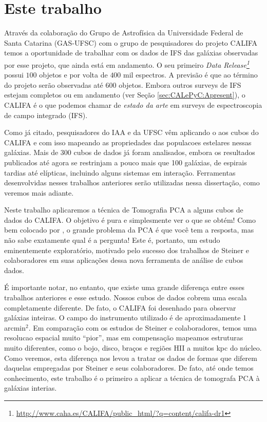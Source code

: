 \section{Este trabalho}
\label{sec:Intro:ThisWork}

Através da colaboração do Grupo de Astrofísica da Universidade Federal de Santa Catarina (GAS-UFSC) com o grupo de
pesquisadores do projeto CALIFA temos a oportunidade de trabalhar com os dados de IFS das galáxias observadas por esse
projeto, que ainda está em andamento. O seu primeiro {\em Data
Release\footnote{\url{http://www.caha.es/CALIFA/public_html/?q=content/califa-dr1}}} \citep[][DR1]{Husemann2013} possui
$100$ objetos e por volta de $400$ mil espectros. A previsão é que ao término do projeto serão observadas até $600$
objetos. Embora outros surveys de IFS estejam completos ou em andamento (ver Seção \ref{sec:CALePyC:Apresent}), o CALIFA
é o que podemos chamar de {\em estado da arte} em surveys de espectroscopia de campo integrado (IFS).

Como já citado, pesquisadores do IAA e da UFSC vêm aplicando o \starlight aos cubos do CALIFA e com isso mapeando as
propriedades das populacoes estelares nessas galáxias. Mais de 300 cubos de dados já foram analisados, embora os
resultados publicados até agora se restrinjam a pouco mais que 100 galáxias, de espirais tardias até elípticas,
incluindo alguns sistemas em interação. Ferramentas desenvolvidas nesses trabalhos anteriores serão utilizadas nessa
dissertação, como veremos mais adiante.

Neste trabalho aplicaremos a técnica de Tomografia PCA a alguns cubos de dados do CALIFA. O objetivo é pura e
simplesmente ver o que se obtém! Como bem colocado por \citet{Steiner2009}, o grande problema da PCA é que você tem a
resposta, mas não sabe exatamente qual é a pergunta! Este é, portanto, um estudo eminentemente exploratório, motivado
pelo sucesso dos trabalhos de Steiner e colaboradores em suas aplicações dessa nova ferramenta de análise de cubos
dados.

É importante notar, no entanto, que existe uma grande diferença entre esses trabalhos anteriores e esse estudo.  Nossos
cubos de dados cobrem uma escala completamente diferente. De fato, o CALIFA foi desenhado para observar galáxias
inteiras. O campo do instrumento utilizado é de aproximadamente 1 arcmin$^2$. Em comparação com os estudos de Steiner e
colaboradores, temos uma resolucao espacial muito ``pior'', mas em compensação mapeamos estruturas muito diferentes, como
o bojo, disco, braços e regiões HII a muitos kpc do núcleo. Como veremos, esta diferença nos levou a tratar os dados
de formas que diferem daquelas empregadas por Steiner e seus colaboradores. De fato, até onde temos conhecimento, este
trabalho é o primeiro a aplicar a técnica de tomografa PCA à galáxias interias.

